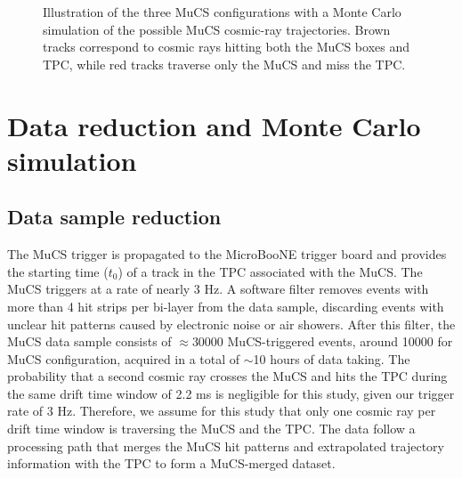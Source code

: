 \documentclass[a4paper,11pt]{article}
\begin{document}
\begin{figure}[htbp]
  \caption{Illustration of the three MuCS configurations with a Monte Carlo simulation of the possible MuCS cosmic-ray trajectories. Brown tracks correspond to cosmic rays hitting both the MuCS boxes and TPC, while red tracks traverse only the MuCS and miss the TPC.} \label{fig:mucs}
\end{figure}


\section{Data reduction and Monte Carlo simulation}\label{sec:merging}

\subsection{Data sample reduction}\label{sec:data_proc}
The MuCS trigger is propagated to the MicroBooNE trigger board and provides the starting time ($t_0$) of a track in the TPC associated with the MuCS.
The MuCS triggers at a rate of nearly 3 Hz.
A software filter removes events with more than 4 hit strips per bi-layer from the data sample, discarding events with unclear hit patterns caused by electronic noise or air showers. After this filter, the MuCS data sample consists of $\approx$30000 MuCS-triggered events, around 10000 for MuCS configuration, acquired in a total of $\sim$10 hours of data taking.
The probability that a second cosmic ray crosses the MuCS and hits the TPC during the same drift time window of 2.2 ms is negligible for this study, given our trigger rate of 3 Hz. Therefore, we assume for this study that only one cosmic ray per drift time window is traversing the MuCS and the TPC.
The data follow a processing path that merges the MuCS hit patterns and extrapolated trajectory information with the TPC to form a MuCS-merged dataset. %

\end{document}
